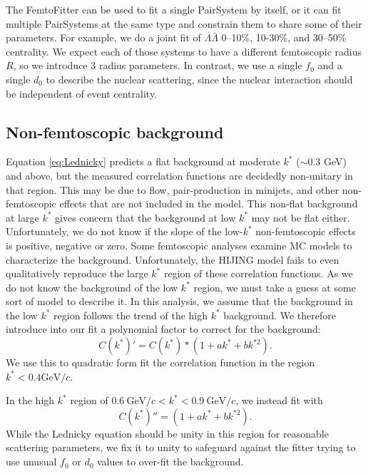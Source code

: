 The FemtoFitter can be used to fit a single PairSystem by itself, or it can fit multiple PairSystems at the same type and constrain them to share some of their parameters.
For example, we do a joint fit of $\Lambda\bar{\Lambda}$ 0--10\%, 10-30\%, and 30--50\% centrality.  
We expect each of those systems to have a different femtoscopic radius $R$, so we introduce 3 radius parameters. 
In contrast, we use a single $f_0$ and a single $d_0$ to describe the nuclear scattering, since the nuclear interaction should be independent of event centrality.

\subsection{Non-femtoscopic background}
\label{sec:NonFemtoBackground}
Equation \ref{eq:Lednicky} predicts a flat background at moderate $k^*$ ($\sim 0.3$ GeV) and above, but the measured correlation functions are decidedly non-unitary in that region.  
This may be due to flow, pair-production in minijets, and other non-femtoscopic effects that are not included in the model.
This non-flat background at large $k^*$ gives concern that the background at low $k^*$ may not be flat either.
Unfortunately, we do not know if the slope of the low-$k^*$ non-femtoscopic effects is positive, negative or zero.
Some femtoscopic analyses examine MC models to characterize the background.
Unfortunately, the HIJING model fails to even qualitatively reproduce the large $k^*$ region of these correlation functions.
As we do not know the background of the low $k^*$ region, we must take a guess at some sort of model to describe it.
In this analysis, we assume that the background in the low $k^*$ region follows the trend of the high $k^*$ background.
We therefore introduce into our fit a polynomial factor to correct for the background:
\begin{equation}
\label{eq:BkgParams}
C(k^*)' = C(k^*) * (1 + ak^* + bk^{*2}).
\end{equation}
We use this to quadratic form fit the correlation function in the region $k^* <  0.4 \mathrm{GeV}/c$. 

In the high $k^*$ region of $0.6\ \mathrm{GeV}/c < k^* < 0.9\ \mathrm{GeV}/c$, we instead fit with 
\begin{equation}
\label{eq:HighBackgroundFit}
C(k^*)'' = (1 + ak^* + bk^{*2}).
\end{equation}
While the Lednicky equation should be unity in this region for reasonable scattering parameters, we fix it to unity to safeguard against the fitter trying to use unusual $f_0$ or $d_0$ values to over-fit the background.

